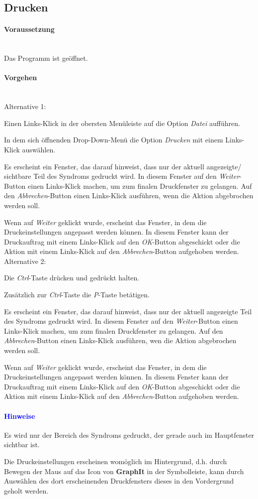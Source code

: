 \documentclass[enabledeprecatedfontcommands,fontsize=11pt,paper=a4,twoside]{scrartcl}
\newcounter{one}
\newcounter{two}[one]
\newcommand*{\hint}{\paragraph{\textcolor{blue}{Hinweise}}}
\newcommand*{\condition}{\paragraph{Voraussetzung}$\;$ \vspace{0.2cm}\\}
\newcommand*{\actions}{\paragraph{Vorgehen} $\;$\vspace{0.2cm}\\}
\newcommand*{\aOne}{\textcolor{bbe}{Alternative 1:}}
\newcommand*{\aTwo}{\textcolor{bbe}{Alternative 2:}}
\let\tempone\itemize
\let\temptwo\enditemize
\renewenvironment{itemize}{\tempone\addtolength{\itemsep}{-10.0pt}}{\temptwo}
\let\origenumerate\enumerate
\let\origendenumerate\endenumerate
\renewenvironment{enumerate}{\origenumerate \addtolength{\itemsep}{-10.0pt}}{\origendenumerate}
\begin{document}
\subsection{Drucken} \label{print}
	\condition 
	Das Programm ist geöffnet.
	\actions
	\aOne
	\begin{enumerate}
		\item Einen Links-Klick in der obersten Menüleiste auf die Option \textit{Datei} aufführen.
		\item In dem sich öffnenden Drop-Down-Menü die Option \textit{Drucken} mit einem Links-Klick auswählen.
		\item Es erscheint ein Fenster, das darauf hinweist, dass nur der aktuell angezeigte/ sichtbare Teil des Syndroms gedruckt wird. In diesem Fenster auf den \textit{Weiter}-Button einen Links-Klick machen, um zum finalen Druckfenster zu gelangen. Auf den \textit{Abbrechen}-Button einen Links-Klick ausführen, wenn die Aktion abgebrochen werden soll.
		\item Wenn auf \textit{Weiter} geklickt wurde, erscheint das Fenster, in dem die Druckeinstellungen angepasst werden können. In diesem Fenster kann der Druckauftrag mit einem Links-Klick auf den \textit{OK}-Button abgeschickt oder die Aktion mit einem Links-Klick auf den \textit{Abbrechen}-Button aufgehoben werden.
	\end{enumerate} 
	\aTwo
	\begin{enumerate}
		\item Die \textit{Ctrl}-Taste drücken und gedrückt halten.
		\item Zusätzlich zur \textit{Ctrl}-Taste die \textit{P}-Taste betätigen.
		\item Es erscheint ein Fenster, das darauf hinweist, dass nur der aktuell angezeigte Teil des Syndroms gedruckt wird. In diesem Fenster auf den \textit{Weiter}-Button einen Links-Klick machen, um zum finalen Druckfenster zu gelangen. Auf den \textit{Abbrechen}-Button einen Links-Klick ausführen, wen die Aktion abgebrochen werden soll.
		\item Wenn auf \textit{Weiter} geklickt wurde, erscheint das Fenster, in dem die Druckeinstellungen angepasst werden können. In diesem Fenster kann der Druckauftrag mit einem Links-Klick auf den \textit{OK}-Button abgeschickt oder die Aktion mit einem Links-Klick auf den \textit{Abbrechen}-Button aufgehoben werden.
	\end{enumerate} 
	\hint
	\begin{itemize}
		\item Es wird nur der Bereich des Syndroms gedruckt, der gerade auch im Hauptfenster sichtbar ist.
		\item Die Druckeinstellungen erscheinen womöglich im Hintergrund, d.h. durch Bewegen der Maus auf das Icon von \textbf{GraphIt} in der Symbolleiste, kann durch Auswählen des dort erscheinenden Druckfensters dieses in den Vordergrund geholt werden. \\
	\end{itemize}
\end{document}
